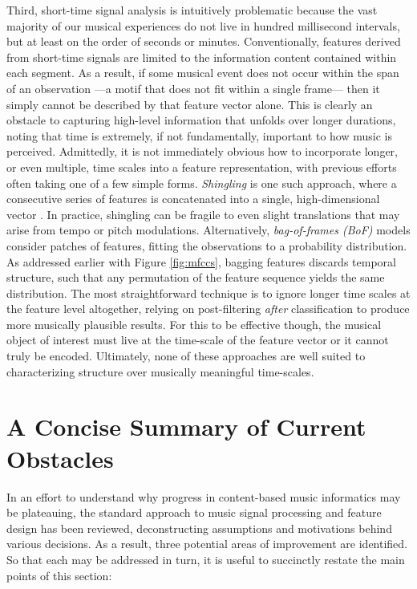 Third, short-time signal analysis is intuitively problematic because the vast majority of our musical experiences do not live in hundred millisecond intervals, but at least on the order of seconds or minutes.
Conventionally, features derived from short-time signals are limited to the information content contained within each segment.
As a result, if some musical event does not occur within the span of an observation ---a motif that does not fit within a single frame--- then it simply cannot be described by that feature vector alone.
This is clearly an obstacle to capturing high-level information that unfolds over longer durations, noting that time is extremely, if not fundamentally, important to how music is perceived.
Admittedly, it is not immediately obvious how to incorporate longer, or even multiple, time scales into a feature representation, with previous efforts often taking one of a few simple forms.
\emph{Shingling} is one such approach, where a consecutive series of features is concatenated into a single, high-dimensional vector \cite{Casey2008}.
In practice, shingling can be fragile to even slight translations that may arise from tempo or pitch modulations.
Alternatively, \emph{bag-of-frames (BoF)} models consider patches of features, fitting the observations to a probability distribution.
As addressed earlier with Figure \ref{fig:mfccs}, bagging features discards temporal structure, such that any permutation of the feature sequence yields the same distribution.
The most straightforward technique is to ignore longer time scales at the feature level altogether, relying on post-filtering \emph{after} classification to produce more musically plausible results.
For this to be effective though, the musical object of interest must live at the time-scale of the feature vector or it cannot truly be encoded.
Ultimately, none of these approaches are well suited to characterizing structure over musically meaningful time-scales.



\section{A Concise Summary of Current Obstacles}
\label{sec:obstacles}
In an effort to understand why progress in content-based music informatics may be plateauing, the standard approach to music signal processing and feature design has been reviewed, deconstructing assumptions and motivations behind various decisions.
As a result, three potential areas of improvement are identified.
So that each may be addressed in turn, it is useful to succinctly restate the main points of this section:

